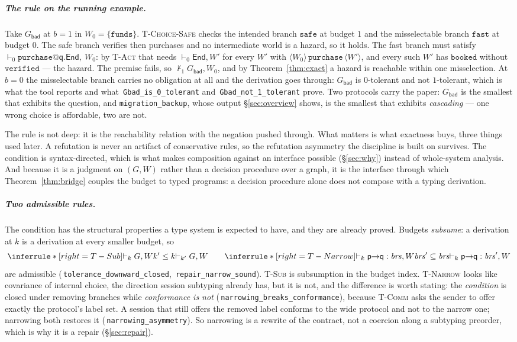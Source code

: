 \documentclass[a4paper,UKenglish,cleveref,autoref,thm-restate,anonymous]{lipics-v2021}
\newcommand{\id}[1]{\texttt{#1}}
\newcommand{\End}{\mathsf{End}}
\newcommand{\coqok}[1]{\textcolor{okgreen}{\ding{51}}\,\texttt{\small #1}}
\begin{document}
\subparagraph*{The rule on the running example.} Take $G_{\mathsf{bad}}$ at
$b=1$ in $W_0=\{\id{funds}\}$. \textsc{T-Choice-Safe} checks the intended
branch $\id{safe}$ at budget $1$ and the misselectable branch $\id{fast}$ at
budget $0$. The safe branch verifies then purchases and no intermediate world
is a hazard, so it holds. The fast branch must satisfy
$\vdash_0 \id{purchase}@\mathsf q.\End,\ W_0$: by \textsc{T-Act} that needs
$\vdash_0 \End, W'$ for every $W'$ with
$\langle W_0\rangle\,\id{purchase}\,\langle W'\rangle$, and every such $W'$
has $\id{booked}$ without $\id{verified}$ --- the hazard. The premise fails, so
$\nvdash_1 G_{\mathsf{bad}}, W_0$, and by Theorem~\ref{thm:exact} a hazard is
reachable within one misselection. At $b=0$ the misselectable branch carries no
obligation at all and the derivation goes through: $G_{\mathsf{bad}}$ is
$0$-tolerant and not $1$-tolerant, which is what the tool reports and what
\coqok{Gbad\_is\_0\_tolerant} and \coqok{Gbad\_not\_1\_tolerant} prove.
Two protocols carry the paper: $G_{\mathsf{bad}}$ is the smallest that exhibits
the question, and \texttt{migration\_backup}, whose output \S\ref{sec:overview}
shows, is the smallest that exhibits \emph{cascading} --- one wrong choice is
affordable, two are not.

The rule is not deep: it is the reachability relation with the negation pushed
through. What matters is what exactness buys, three things used later. A refutation is never an
artifact of conservative rules, so the refutation asymmetry the discipline is
built on survives. The condition is syntax-directed, which is what makes
composition against an interface possible (\S\ref{sec:why}) instead of
whole-system analysis. And because it is a judgment on $(G,W)$ rather than a
decision procedure over a graph, it is the interface through which
Theorem~\ref{thm:bridge} couples the budget to typed programs: a decision
procedure alone does not compose with a typing derivation. \subparagraph*{Two admissible rules.} The condition has the structural
properties a type system is expected to have, and they are already proved.
Budgets \emph{subsume}: a derivation at $k$ is a derivation at every smaller
budget, so
\[
\inferrule*[right=T-Sub]{\vdash_k G, W \\ k'\le k}{\vdash_{k'} G, W}
\qquad
\inferrule*[right=T-Narrow]{\vdash_k \mathsf p{\to}\mathsf q:\mathit{brs}, W
  \\ \mathit{brs}'\subseteq\mathit{brs}}
  {\vdash_k \mathsf p{\to}\mathsf q:\mathit{brs}', W}
\]
are admissible (\coqok{tolerance\_downward\_closed},
\coqok{repair\_narrow\_sound}). \textsc{T-Sub} is subsumption in the budget
index. \textsc{T-Narrow} looks like covariance of internal choice, the
direction session subtyping already has, but it is not, and the difference is
worth stating: the \emph{condition} is closed under removing branches while
\emph{conformance is not} (\coqok{narrowing\_breaks\_conformance}), because
\textsc{T-Comm} asks the sender to offer exactly the protocol's label set. A
session that still offers the removed label conforms to the wide protocol and
not to the narrow one; narrowing both restores it
(\coqok{narrowing\_asymmetry}). So narrowing is a rewrite of the contract, not
a coercion along a subtyping preorder, which is why it is a repair
(\S\ref{sec:repair}).
\end{document}
